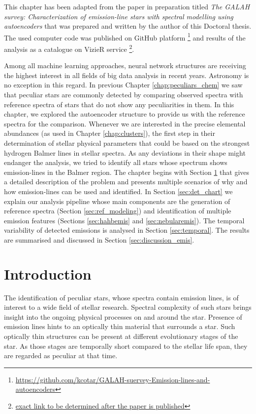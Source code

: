This chapter has been adapted from the paper in preparation titled \textit{The GALAH survey: Characterization of emission-line stars with spectral modelling using autoencoders} \cite{2020arXiv200603062C} that was prepared and written by the author of this Doctoral thesis. The used computer code was published on GitHub platform \footnote{\url{https://github.com/kcotar/GALAH-suervey-Emission-lines-and-autoencoders}} and results of the analysis as a catalogue on VizieR service \footnote{\href{http://vizier.u-strasbg.fr/viz-bin/}{exact link to be determined after the paper is published}}.

Among all machine learning approaches, neural network structures are receiving the highest interest in all fields of big data analysis in recent years. Astronomy is no exception in this regard. In previous Chapter \ref{chap:peculiars_chem} we saw that peculiar stars are commonly detected by comparing observed spectra with reference spectra of stars that do not show any peculiarities in them. In this chapter, we explored the autoencoder structure to provide us with the reference spectra for the comparison. Whenever we are interested in the precise elemental abundances (as used in Chapter \ref{chap:clusters}), the first step in their determination of stellar physical parameters that could be based on the strongest hydrogen Balmer lines in stellar spectra. As any deviations in their shape might endanger the analysis, we tried to identify all stars whose spectrum shows emission-lines in the Balmer region. The chapter begins with Section \ref{sec:intro_emis} that gives a detailed description of the problem and presents multiple scenarios of why and how emission-lines can be used and identified. In Section \ref{sec:det_chart} we explain our analysis pipeline whose main components are the generation of reference spectra (Section \ref{sec:ref_modeling}) and identification of multiple emission features (Sections \ref{sec:hahbemis} and \ref{sec:nebularemis}). The temporal variability of detected emissions is analysed in Section \ref{sec:temporal}. The results are summarised and discussed in Section \ref{sec:discussion_emis}.

\section{Introduction}
\label{sec:intro_emis}
The identification of peculiar stars, whose spectra contain emission lines, is of interest to a wide field of stellar research. Spectral complexity of such stars brings insight into the ongoing physical processes on and around the star. Presence of emission lines hints to an optically thin material that surrounds a star. Such optically thin structures can be present at different evolutionary stages of the star. As those stages are temporally short compared to the stellar life span, they are regarded as peculiar at that time.

